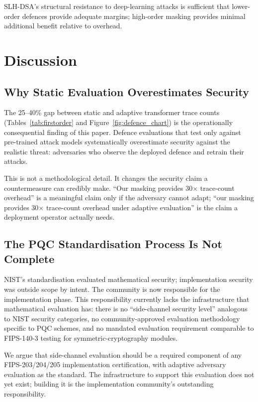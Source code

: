 \documentclass[sigconf,nonacm]{acmart}
\begin{document}
SLH-DSA's structural resistance to deep-learning attacks is sufficient
that lower-order defences provide adequate margins; high-order masking
provides minimal additional benefit relative to overhead.

\section{Discussion}

\subsection{Why Static Evaluation Overestimates Security}

The 25--40\% gap between static and adaptive transformer trace counts
(Tables~\ref{tab:firstorder} and Figure~\ref{fig:defence_chart}) is
the operationally consequential finding of this paper. Defence
evaluations that test only against pre-trained attack models
systematically overestimate security against the realistic threat:
adversaries who observe the deployed defence and retrain their attacks.

This is not a methodological detail. It changes the security claim a
countermeasure can credibly make. ``Our masking provides
30$\times$ trace-count overhead'' is a meaningful claim only if the
adversary cannot adapt; ``our masking provides 30$\times$ trace-count
overhead under adaptive evaluation'' is the claim a deployment
operator actually needs.

\subsection{The PQC Standardisation Process Is Not Complete}

NIST's standardisation evaluated mathematical security; implementation
security was outside scope by intent. The community is now responsible
for the implementation phase. This responsibility currently lacks the
infrastructure that mathematical evaluation has: there is no
``side-channel security level'' analogous to NIST security categories,
no community-approved evaluation methodology specific to PQC schemes,
and no mandated evaluation requirement comparable to FIPS-140-3
testing for symmetric-cryptography modules.

We argue that side-channel evaluation should be a required component
of any FIPS-203/204/205 implementation certification, with adaptive
adversary evaluation as the standard. The infrastructure to support
this evaluation does not yet exist; building it is the implementation
community's outstanding responsibility.
\end{document}
